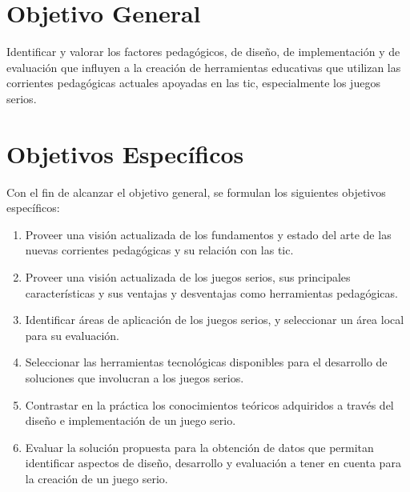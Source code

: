 \section{Objetivo General}
\label{sec:objetivos_generales}

Identificar y valorar los factores pedagógicos, de diseño, de implementación y
de evaluación que influyen a la creación de herramientas educativas que utilizan
las corrientes pedagógicas actuales apoyadas en las \gls{tic}, especialmente 
los juegos serios. 

\section{Objetivos Específicos}

Con el fin de alcanzar el objetivo general, se formulan los siguientes
objetivos específicos:

\begin{enumerate}

\item Proveer una visión actualizada de los fundamentos y estado del arte de las nuevas corrientes pedagógicas y su relación con las \gls{tic}.

\item Proveer una visión actualizada de los juegos serios, sus principales características y sus ventajas y desventajas como herramientas pedagógicas.

\item Identificar áreas de aplicación de los juegos serios, y seleccionar un área local para su evaluación.

\item Seleccionar las herramientas tecnológicas disponibles para el desarrollo de soluciones que involucran a los juegos serios.

\item Contrastar en la práctica los conocimientos teóricos adquiridos a través del diseño e implementación de un juego serio.

\item Evaluar la solución propuesta para la obtención de datos que permitan identificar aspectos de diseño, desarrollo y evaluación a tener en cuenta para la creación de un juego serio.
    
\end{enumerate}
